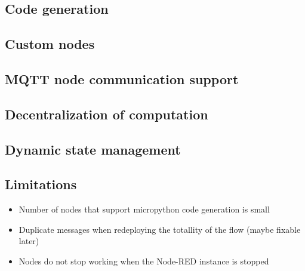 \subsection{Code generation}

\subsection{Custom nodes}

\subsection{MQTT node communication support}

\subsection{Decentralization of computation}

\subsection{Dynamic state management}

\subsection{Limitations}

\begin{itemize}
    \item Number of nodes that support micropython code generation is small
    \item Duplicate messages when redeploying the totallity of the flow (maybe fixable later)
    \item Nodes do not stop working when the Node-RED instance is stopped
\end{itemize}
